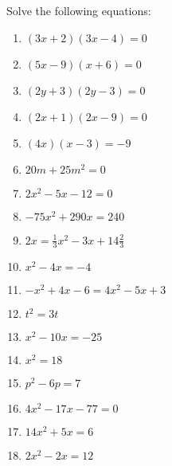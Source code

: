 \begin{solutions}{}
{\begin{enumerate}[itemsep=5pt, label=\textbf{\arabic*}. ]
\end{enumerate}}
\end{solutions}



\begin{exercises}{ }
{
Solve the following equations:
\begin{multicols}{2}
\begin{enumerate}[itemsep=5pt, label=\textbf{\arabic*}. ] 
\item  $(3x+2)(3x-4)=0$
\item  $(5x-9)(x+6)=0$
\item  $(2y+3)(2y-3)=0$ 
\item  $(2x+1)(2x-9)=0$    
\item  $(4x)(x-3)=-9$       
\item  $20m+25{m}^{2}=0$
\item  $2{x}^{2}-5x-12=0$  
\item  $-75{x}^{2}+290x=240$
\item  $2x=\frac{1}{3}{x}^{2}-3x+14\frac{2}{3}$
\item  ${x}^{2}-4x=-4$      
\item  $-{x}^{2}+4x-6=4{x}^{2}-5x+3$       
\item  ${t}^{2}=3t$  
\item  ${x}^{2}-10x=-25$      
\item  ${x}^{2}=18$
\item  ${p}^{2}-6p=7$
\item  $4{x}^{2}-17x-77=0$
\item  $14{x}^{2}+5x=6$
\item  $2{x}^{2}-2x=12$              
\end{enumerate}
\end{multicols}

}
\end{exercises}


